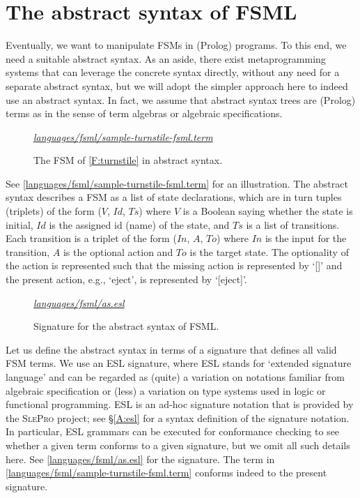 \documentclass[preprint,authoryear,12pt]{noelsarticle}
\newcommand{\m}[1]{\ensuremath{\mathit{#1}}}
\newcommand{\slepro}{\textsc{SlePro}}
\newcommand{\codefigure}[3]{
\begin{figure}[t!]
\begin{boxedminipage}{\hsize}
\mbox{}\hfill{}{\small\textit{\href{http://github.com/slebok/slepro/tree/master/#2}{#2}}}

\end{boxedminipage}
\caption{#1.}
\label{#2}
\medskip
\end{figure}}
\begin{document}
\section{The abstract syntax of FSML}
\label{S:abstract}

Eventually, we want to manipulate FSMs in (Prolog) programs. To this
end, we need a suitable abstract syntax. As an aside, there exist
metaprogramming systems that can leverage the concrete syntax
directly, without any need for a separate abstract syntax, but we will
adopt the simpler approach here to indeed use an abstract syntax. In
fact, we assume that abstract syntax trees are (Prolog) terms as in
the sense of term algebras or algebraic specifications.

\codefigure{%
The FSM of \autoref{F:turnstile} in abstract syntax}{%
languages/fsml/sample-turnstile-fsml.term}{%
prolog}

See \autoref{languages/fsml/sample-turnstile-fsml.term} for an
illustration. The abstract syntax describes a FSM as a list of state
declarations, which are in turn tuples (triplets) of the form (\m{V},
\m{Id}, \m{Ts}) where \m{V} is a Boolean saying whether the state is
initial, \m{Id} is the assigned id (name) of the state, and \m{Ts} is
a list of transitions. Each transition is a triplet of the form
(\m{In}, \m{A}, \m{To}) where \m{In} is the input for the transition,
\m{A} is the optional action and \m{To} is the target state. The
optionality of the action is represented such that the missing action
is represented by `[]' and the present action, e.g., `eject', is
represented by `[eject]'.

\codefigure{%
Signature for the abstract syntax of FSML}{%
languages/fsml/as.esl}{%
esl}

Let us define the abstract syntax in terms of a signature that defines
all valid FSM terms. We use an ESL signature, where ESL stands for
`extended signature language' and can be regarded as (quite) a
variation on notations familiar from algebraic specification or (less)
a variation on type systems used in logic or functional
programming. ESL is an ad-hoc signature notation that is provided by
the \slepro{} project; see \S\ref{A:esl} for a syntax definition of
the signature notation. In particular, ESL grammars can be executed
for conformance checking to see whether a given term conforms to a
given signature, but we omit all such details here. See
\autoref{languages/fsml/as.esl} for the signature. The term in
\autoref{languages/fsml/sample-turnstile-fsml.term} conforms indeed to
the present signature.
\end{document}
